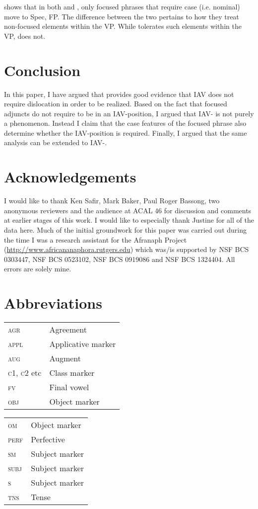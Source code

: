 \documentclass[output=paper
,newtxmath
,modfonts
,nonflat]{langsci/langscibook}
\begin{document}
 shows that in both  and , only focused phrases that require case (i.e. nominal) move to Spec, FP. The difference between the two pertains to how they treat non-focused elements within the VP. While  tolerates such elements within the VP,  does not. 

\section{Conclusion}\label{sec:selvanathan:7}
In this paper, I have argued that  provides good evidence that IAV  does not require dislocation in order to be realized. Based on the fact that  focused adjuncts do not require to be in an IAV-position, I argued that IAV- is not purely a  phenomenon. Instead I claim that the case features of the focused phrase also determine whether the IAV-position is required. Finally, I argued that the same analysis can be extended to  IAV-.

\section*{Acknowledgements}
I would like to thank Ken Safir, Mark Baker, Paul Roger Bassong, two anonymous reviewers and the audience at ACAL 46 for discussion and comments at earlier stages of this work. I would like to especially thank Justine  for all of the  data here. Much of the initial groundwork for this paper was carried out during the time I was a research assistant for the Afranaph Project (\url{http://www.africananaphora.rutgers.edu}) which was\slash is supported by NSF BCS 0303447, NSF BCS 0523102, NSF BCS 0919086 and NSF BCS 1324404. All errors are solely mine.

\section*{Abbreviations}
\begin{tabularx}{.5\textwidth}{@{}lQ}
\textsc{agr} & Agreement\\
\textsc{appl} & Applicative marker\\
\textsc{aug} & Augment\\
\textsc{c1, c2} etc & Class marker\\
\textsc{fv} & Final vowel\\
\textsc{obj} & Object marker\\
\end{tabularx}%
\begin{tabularx}{.5\textwidth}{lQ@{}}
\textsc{om} & Object marker\\
\textsc{perf} & Perfective\\
\textsc{sm} & Subject marker\\
\textsc{subj} & Subject marker\\
\textsc{s} & Subject marker\\
\textsc{tns} & Tense\\
\end{tabularx}
\end{document}
